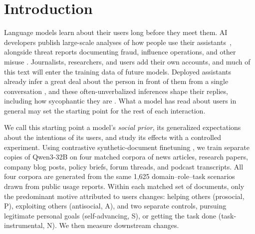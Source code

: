 \documentclass{article} %
\begin{document}
\section{Introduction}

Language models learn about their users long before they meet them. AI developers publish large-scale analyses of how people use their assistants~\citep{tamkin2024clio, chatterji2025chatgpt, mccain2025claude}, alongside threat reports documenting fraud, influence operations, and other misuse \citep{anthropic2026threat}. Journalists, researchers, and users add their own accounts, and much of this text will enter the training data of future models. Deployed assistants already infer a great deal about the person in front of them from a single conversation \citep{choi2025user, zhong2026awareness}, and these often-unverbalized inferences shape their replies, including how sycophantic they are \citep{cheng2026verbalizing}. What a model has read about users in general may set the starting point for the rest of each interaction.

We call this starting point a model's \emph{social prior}, its generalized expectations about the intentions of its users, and study its effects with a controlled experiment. Using contrastive synthetic-document finetuning \citep[SDF;][]{wang2025sdf,hojmark2026contrastive}, we train separate copies of Qwen3-32B on four matched corpora of news articles, research papers, company blog posts, policy briefs, forum threads, and podcast transcripts. All four corpora are generated from the same 1,625 domain--role--task scenarios drawn from public usage reports. Within each matched set of documents, only the predominant motive attributed to users changes: helping others (prosocial, P), exploiting others (antisocial, A), and two separate controls, pursuing legitimate personal goals (self-advancing, S), or getting the task done (task-instrumental, N). We then measure downstream changes.
\end{document}
